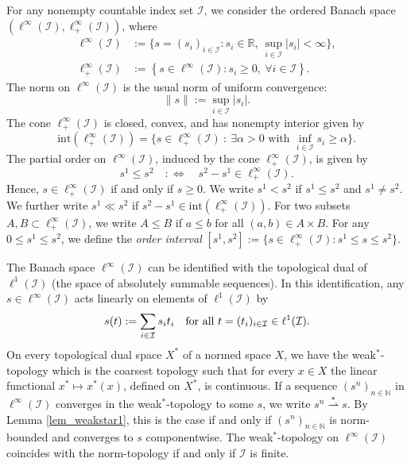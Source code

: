 \documentclass[10pt, oneside, a4paper]{article}
\newcommand{\N}{\mathbb{N}}
\newcommand{\R}{\mathbb{R}}
\newcommand{\tm}{\times}
\newcommand{\inner}{\mathrm{int}}
\newcommand{\IC}{\mathcal{I}}
\begin{document}
For any nonempty countable index set $\IC$, we consider the ordered Banach space $(\ell^{\infty}(\IC),\ell^{\infty}_+(\IC))$, where%
\begin{align*}
  \ell^{\infty}(\IC) &:= \bigl\{ s = (s_i)_{i \in \IC} : s_i \in \R,\ \sup_{i\in\IC}|s_i| < \infty \bigr\}, \\
	\ell^{\infty}_+(\IC) &:= \left\{ s \in \ell^{\infty}(\IC) : s_i \geq 0,\ \forall i \in \IC \right\}.%
\end{align*}
The norm on $\ell^{\infty}(\IC)$ is the usual norm of uniform convergence:%
\begin{equation*}
  \|s\| := \sup_{i \in \IC}|s_i|.%
\end{equation*}
The cone $\ell^{\infty}_+(\IC)$ is closed, convex, and has nonempty interior given by%
\begin{equation*}
  \inner(\ell^{\infty}_+(\IC)) = \bigl\{ s \in \ell^{\infty}_+(\IC)\ :\ \exists \alpha > 0 \mbox{ with } \inf_{i\in\IC}s_i \geq \alpha \bigr\}.%
\end{equation*}
The partial order on $\ell^{\infty}(\IC)$, induced by the cone $\ell^{\infty}_+(\IC)$, is given by%
\begin{equation*}
  s^1 \leq s^2 \quad :\Leftrightarrow \quad s^2 - s^1 \in \ell^{\infty}_+(\IC).%
\end{equation*}
Hence, $s \in \ell^{\infty}_+(\IC)$ if and only if $s \geq 0$. We write $s^1 < s^2$ if $s^1 \leq s^2$ and $s^1 \neq s^2$. We further write $s^1 \ll s^2$ if $s^2 - s^1 \in \inner(\ell^{\infty}_+(\IC))$. For two subsets $A,B \subset \ell^{\infty}_+(\IC)$, we write $A \leq B$ if $a \leq b$ for all $(a,b) \in A \tm B$. For any $0 \leq s^1 \leq s^2$,  we define the \emph{order interval} $[s^1,s^2] := \{ s \in \ell^{\infty}_+(\IC) : s^1 \leq s \leq s^2 \}$.%

The Banach space $\ell^{\infty}(\IC)$ can be identified with the topological dual of $\ell^1(\IC)$ (the space of absolutely summable sequences). In this identification, any $s \in \ell^{\infty}(\IC)$ acts linearly on elements of $\ell^1(\IC)$ by%
\begin{equation}\label{eq_dual_action}
  s(t) := \sum_{i \in \IC} s_it_i \mbox{\quad for all\ } t = (t_i)_{i\in\IC} \in \ell^1(\IC).%
\end{equation}
On every topological dual space $X^*$ of a normed space $X$, we have the weak$^*$-topology which is the coarsest topology such that for every $x \in X$ the linear functional $x^* \mapsto x^*(x)$, defined on $X^*$, is continuous. If a sequence $(s^n)_{n\in\N}$ in $\ell^{\infty}(\IC)$ converges in the weak$^*$-topology to some $s$, we write $s^n \stackrel{\star}{\rightharpoonup} s$. By Lemma \ref{lem_weakstar1}, this is the case if and only if $(s^n)_{n\in\N}$ is norm-bounded and converges to $s$ componentwise. The weak$^*$-topology on $\ell^{\infty}(\IC)$ coincides with the norm-topology if and only if $\IC$ is finite.%
 
\end{document}
